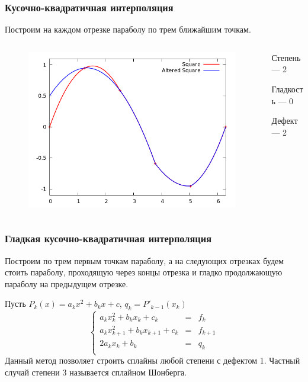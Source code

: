 \documentclass[aspectratio=43,unicode]{beamer}
\begin{document}
\begin{frame}
\frametitle{Кусочно-квадратичная интерполяция}
	Построим на каждом отрезке параболу по трем ближайшим точкам.
	\begin{columns}[c]
	\begin{column}{0.6\textwidth}
	\begin{figure}
	\center
	\includegraphics[width=\textwidth]{spline2_2.png}%
	\end{figure}
	\end{column}
	\begin{column}{0.4\textwidth}
	Степень --- 2

	Гладкость --- 0

	Дефект --- 2
	\end{column}
	\end{columns}
\end{frame}

\begin{frame}
\frametitle{Гладкая кусочно-квадратичная интерполяция}
	Построим по трем первым точкам параболу, а на следующих отрезках будем стоить параболу, проходящую
	через концы отрезка и гладко продолжающую параболу на предыдущем отрезке.

	Пусть $P_k(x) = a_kx^2+b_kx+c$, $q_k = P'_{k-1}(x_k)$
	\[
	\left\{
	\begin{array}{lcl}
		a_kx_k^2+b_kx_k+c_k &=& f_k\\
		a_kx_{k+1}^2+b_kx_{k+1}+c_k &=& f_{k+1}\\
		2a_kx_k+b_k &=& q_k\\
	\end{array}
	\right.
	\]
	Данный метод позволяет строить сплайны любой степени с дефектом 1. Частный случай степени 3 называется сплайном Шонберга.
\end{frame}
\end{document}
